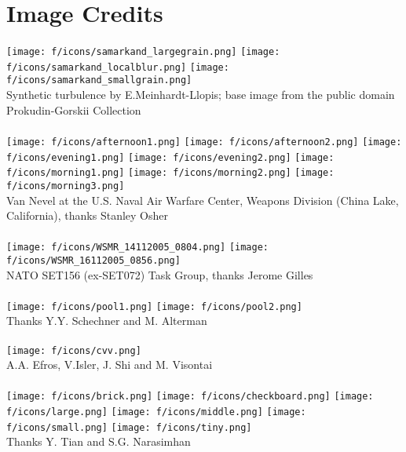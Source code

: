 \documentclass{ipol}
\begin{document}
\section*{Image Credits}
{
\footnotesize

\texttt{[image: f/icons/samarkand\_largegrain.png]}
\texttt{[image: f/icons/samarkand\_localblur.png]}
\texttt{[image: f/icons/samarkand\_smallgrain.png]}
\\
Synthetic turbulence by E.Meinhardt-Llopis; base image from the public domain Prokudin-Gorskii Collection
\\\\
%
\texttt{[image: f/icons/afternoon1.png]}
\texttt{[image: f/icons/afternoon2.png]}
\texttt{[image: f/icons/evening1.png]}
\texttt{[image: f/icons/evening2.png]}
\texttt{[image: f/icons/morning1.png]}
\texttt{[image: f/icons/morning2.png]}
\texttt{[image: f/icons/morning3.png]}
\\
Van Nevel at the U.S. Naval Air Warfare Center, Weapons Division (China Lake, California), thanks Stanley Osher
\\\\
%
\texttt{[image: f/icons/WSMR\_14112005\_0804.png]}
\texttt{[image: f/icons/WSMR\_16112005\_0856.png]}
\\
NATO SET156 (ex-SET072) Task Group, thanks Jerome Gilles
\\\\
%
\texttt{[image: f/icons/pool1.png]}
\texttt{[image: f/icons/pool2.png]}
\\
Thanks Y.Y. Schechner and M. Alterman~\cite{alterman2013detecting}
\\\\
%
\texttt{[image: f/icons/cvv.png]}
\\
A.A. Efros, V.Isler, J. Shi and M. Visontai~\cite{efros2005}
\\\\
%
\texttt{[image: f/icons/brick.png]}
\texttt{[image: f/icons/checkboard.png]}
\texttt{[image: f/icons/large.png]}
\texttt{[image: f/icons/middle.png]}
\texttt{[image: f/icons/small.png]}
\texttt{[image: f/icons/tiny.png]}
\\
Thanks Y. Tian and S.G. Narasimhan~\cite{tian2009seeing}
}

%
%



\end{document}
